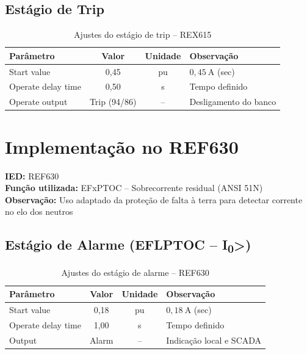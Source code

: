 \documentclass[12pt,a4paper]{article}
\begin{document}
	\subsection*{Estágio de Trip}
	
	\begin{table}[H]
		\centering
		\caption{Ajustes do estágio de trip -- REX615}
		\begin{tabular}{>{\raggedright}p{5cm} c c p{5cm}}
			\toprule
			\textbf{Parâmetro} & \textbf{Valor} & \textbf{Unidade} & \textbf{Observação} \\
			\midrule
			Start value & 0{,}45 & pu & $0{,}45\ \si{\ampere}$ (sec) \\
			Operate delay time & 0{,}50 & s & Tempo definido \\
			Operate output & Trip (94/86) & -- & Desligamento do banco \\
			\bottomrule
		\end{tabular}
	\end{table}
	
	\section{Implementação no REF630}
	
	\textbf{IED:} REF630 \\
	\textbf{Função utilizada:} EFxPTOC -- Sobrecorrente residual (ANSI 51N) \\
	\textbf{Observação:} Uso adaptado da proteção de falta à terra para detectar corrente no elo dos neutros
	
	\subsection*{Estágio de Alarme (EFLPTOC -- I\textsubscript{0}>)}
	
	\begin{table}[H]
		\centering
		\caption{Ajustes do estágio de alarme -- REF630}
		\begin{tabular}{>{\raggedright}p{5cm} c c p{5cm}}
			\toprule
			\textbf{Parâmetro} & \textbf{Valor} & \textbf{Unidade} & \textbf{Observação} \\
			\midrule
			Start value & 0{,}18 & pu & $0{,}18\ \si{\ampere}$ (sec) \\
			Operate delay time & 1{,}00 & s & Tempo definido \\
			Output & Alarm & -- & Indicação local e SCADA \\
			\bottomrule
		\end{tabular}
	\end{table}
	
\end{document}
